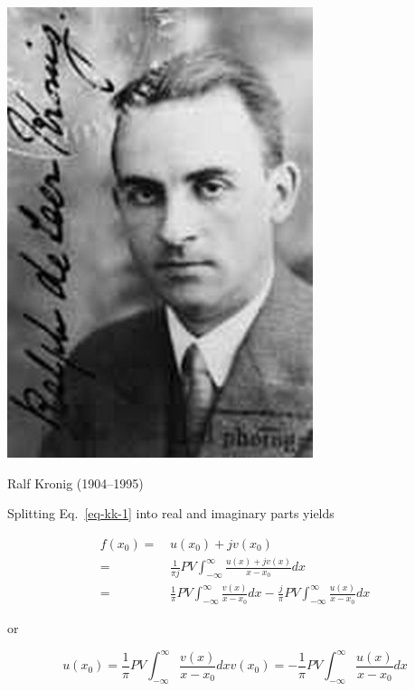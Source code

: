 \begin{marginfigure}[-1.5cm]
  \includegraphics{complex/figures/r_kronig}
  \caption{Ralf Kronig (1904–1995)}
\end{marginfigure}

Splitting Eq.~\ref{eq-kk-1} into real and imaginary parts yields

\begin{align}
f(x_0) =& \, u(x_0) + jv(x_0) \nonumber \\
       =& \, \frac{1}{\pi j} PV \int_{- \infty}^{\infty} \frac{u(x)+jv(x)}{x-x_0}dx
 \nonumber \\
       =& \, \frac{1}{\pi} PV \int_{- \infty}^{\infty} \frac{v(x)}{x-x_0}dx -
\frac{j}{\pi} PV \int_{- \infty}^{\infty} \frac{u(x)}{x-x_0}dx
\end{align}

or

\begin{subequations} 
\begin{equation}
u(x_0) = \frac{1}{\pi} PV \int_{- \infty}^{\infty} \frac{v(x)}{x-x_0}dx
\end{equation} 
\begin{equation}
v(x_0) = -\frac{1}{\pi} PV \int_{- \infty}^{\infty} \frac{u(x)}{x-x_0}dx
\end{equation}
\label{eq-KK}
\end{subequations}

